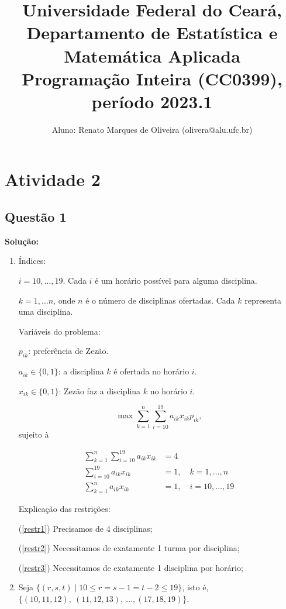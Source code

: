 \documentclass{article}
\title{Universidade Federal do Ceará, Departamento de Estatística e Matemática Aplicada\\ 
Programação Inteira (CC0399), período 2023.1}
\author{Aluno: Renato Marques de Oliveira (olivera@alu.ufc.br)}
\begin{document}
\maketitle

\section*{Atividade 2}

\subsection*{Questão 1}

\textbf{Solução:}

\begin{enumerate}[label=(\roman*)]
    \item Índices:
    
    $i = 10,\dots,19$. Cada $i$ é um horário possível para alguma disciplina.

    $k = 1,\dots n$, onde $n$ é o número de disciplinas ofertadas. Cada $k$ representa uma disciplina.

    Variáveis do problema:

    $p_{ik}$: preferência de Zezão.

    $a_{ik} \in \{0, 1\}$: a disciplina $k$ é ofertada no horário $i$.

    $x_{ik} \in \{0, 1\}$: Zezão faz a disciplina $k$ no horário $i$.

    \[ \max \sum_{k = 1}^{n} \sum_{i = 10}^{19} a_{ik} x_{ik} p_{ik}, \]
    sujeito à 

    \begin{align}
        \sum_{k = 1}^{n} \sum_{i = 10}^{19} a_{ik} x_{ik} &= 4\label{restr1} \\
        \sum_{i = 10}^{19} a_{ik} x_{ik} &= 1,\quad k = 1,\dots,n \label{restr2}\\
        \sum_{k = 1}^{n} a_{ik} x_{ik} &= 1,\quad i = 10,\dots,19 \label{restr3}
    \end{align}

    
    Explicação das restrições:

    (\ref{restr1}) Precisamos de 4 disciplinas;

    (\ref{restr2}) Necessitamos de exatamente 1 turma por disciplina;

    (\ref{restr3}) Necessitamos de exatamente 1  disciplina por horário;

    \item Seja $\allowbreak\{
        (r,s,t) \mid 10 \leq r = s - 1 = t - 2 \leq 19
    \}$, isto é, $\{
        (10, 11, 12),\allowbreak \ (11, 12, 13),\allowbreak \ \dots, (17,18,19)
    \}$.


\end{enumerate}
\end{document}
